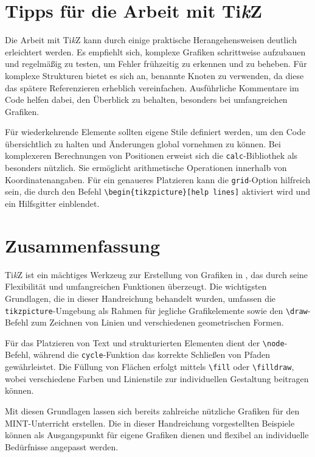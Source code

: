\documentclass[12pt,a4paper]{article}
\begin{document}
\section{Tipps für die Arbeit mit Ti\textit{k}Z}

Die Arbeit mit Ti\textit{k}Z kann durch einige praktische Herangehensweisen deutlich erleichtert werden. Es empfiehlt sich, komplexe Grafiken schrittweise aufzubauen und regelmäßig zu testen, um Fehler frühzeitig zu erkennen und zu beheben. Für komplexe Strukturen bietet es sich an, benannte Knoten zu verwenden, da diese das spätere Referenzieren erheblich vereinfachen. Ausführliche Kommentare im Code helfen dabei, den Überblick zu behalten, besonders bei umfangreichen Grafiken.

Für wiederkehrende Elemente sollten eigene Stile definiert werden, um den Code übersichtlich zu halten und Änderungen global vornehmen zu können. Bei komplexeren Berechnungen von Positionen erweist sich die \texttt{calc}-Bibliothek als besonders nützlich. Sie ermöglicht arithmetische Operationen innerhalb von Koordinatenangaben. Für ein genaueres Platzieren kann die \texttt{grid}-Option hilfreich sein, die durch den Befehl \texttt{\textbackslash begin\{tikzpicture\}[help lines]} aktiviert wird und ein Hilfsgitter einblendet.

\section{Zusammenfassung}

Ti\textit{k}Z ist ein mächtiges Werkzeug zur Erstellung von Grafiken in , das durch seine Flexibilität und umfangreichen Funktionen überzeugt. Die wichtigsten Grundlagen, die in dieser Handreichung behandelt wurden, umfassen die \texttt{tikzpicture}-Umgebung als Rahmen für jegliche Grafikelemente sowie den \texttt{\textbackslash draw}-Befehl zum Zeichnen von Linien und verschiedenen geometrischen Formen. 

Für das Platzieren von Text und strukturierten Elementen dient der \texttt{\textbackslash node}-Befehl, während die \texttt{cycle}-Funktion das korrekte Schließen von Pfaden gewährleistet. Die Füllung von Flächen erfolgt mittels \texttt{\textbackslash fill} oder \texttt{\textbackslash filldraw}, wobei verschiedene Farben und Linienstile zur individuellen Gestaltung beitragen können.

Mit diesen Grundlagen lassen sich bereits zahlreiche nützliche Grafiken für den MINT-Unterricht erstellen. Die in dieser Handreichung vorgestellten Beispiele können als Ausgangspunkt für eigene Grafiken dienen und flexibel an individuelle Bedürfnisse angepasst werden. 
\end{document}
